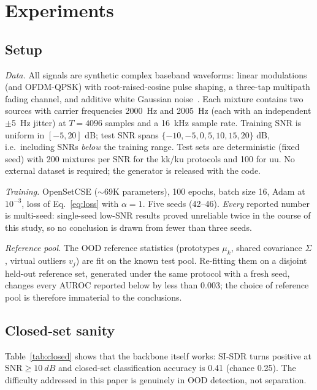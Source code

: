 \documentclass[review,12pt]{elsarticle}
\newcommand{\snr}{\mathrm{SNR}}
\begin{document}
\section{Experiments}
\label{sec:exp}

\subsection{Setup}
\label{sec:expsetup}

\emph{Data.} All signals are synthetic complex baseband waveforms:
linear modulations (and OFDM-QPSK) with root-raised-cosine pulse
shaping, a three-tap multipath fading channel, and additive white
Gaussian noise~\cite{proakis2008digital}. Each mixture contains two
sources with carrier frequencies \SI{2000}{Hz} and \SI{2005}{Hz}
(each with an independent $\pm$\SI{5}{Hz} jitter) at
$T = 4096$ samples and a \SI{16}{kHz} sample rate. Training SNR is
uniform in $[-5, 20]$ dB; test SNR spans
$\{-10, -5, 0, 5, 10, 15, 20\}$ dB, i.e.\ including SNRs \emph{below}
the training range. Test sets are deterministic (fixed seed) with 200
mixtures per SNR for the kk/ku protocols and 100 for uu. No external
dataset is required; the generator is released with the code.

\emph{Training.} OpenSetCSE ($\sim$69K parameters), 100 epochs, batch
size 16, Adam at $10^{-3}$, loss of Eq.~\eqref{eq:loss} with
$\alpha = 1$. Five seeds (42--46).
\emph{Every} reported number is multi-seed: single-seed low-SNR results
proved unreliable twice in the course of this study, so no conclusion is
drawn from fewer than three seeds.

\emph{Reference pool.} The OOD reference statistics (prototypes
$\mu_k$, shared covariance $\Sigma$, virtual outliers $v_j$) are fit on
the known test pool. Re-fitting them on a disjoint held-out reference
set, generated under the same protocol with a fresh seed, changes every
AUROC reported below by less than 0.003; the choice of reference pool
is therefore immaterial to the conclusions.

\subsection{Closed-set sanity}
\label{sec:closed}

Table~\ref{tab:closed} shows that the backbone itself works: SI-SDR
turns positive at $\snr \geq \SI{10}{dB}$ and closed-set classification
accuracy is 0.41 (chance 0.25). The difficulty addressed in this paper
is genuinely in OOD detection, not separation.
\end{document}
